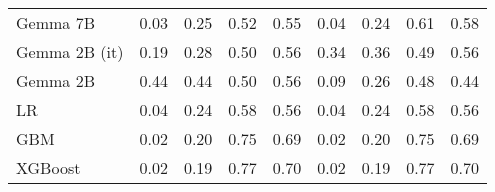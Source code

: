 \begin{tabular}{lllllllll}
Gemma 7B & \cellcolor{cyan!25.0} 0.03 & \cellcolor{cyan!13.7} 0.25 & 0.52 & 0.55 & \cellcolor{cyan!25.0} 0.04 & \cellcolor{cyan!19.0} 0.24 & 0.61 & 0.58 \\
Gemma 2B (it) & 0.19 & 0.28 & 0.50 & 0.56 & 0.34 & 0.36 & \cellcolor{orange!9.3} 0.49 & 0.56 \\
Gemma 2B & \cellcolor{orange!25.0} 0.44 & \cellcolor{orange!25.0} 0.44 & 0.50 & 0.56 & 0.09 & \cellcolor{cyan!4.7} 0.26 & \cellcolor{orange!25.0} 0.48 & \cellcolor{orange!25.0} 0.44 \\
LR & 0.04 & 0.24 & 0.58 & 0.56 & 0.04 & 0.24 & 0.58 & 0.56 \\
GBM & 0.02 & 0.20 & 0.75 & 0.69 & 0.02 & 0.20 & 0.75 & 0.69 \\
XGBoost & 0.02 & 0.19 & 0.77 & 0.70 & 0.02 & 0.19 & 0.77 & 0.70 \\
\bottomrule
\end{tabular}

